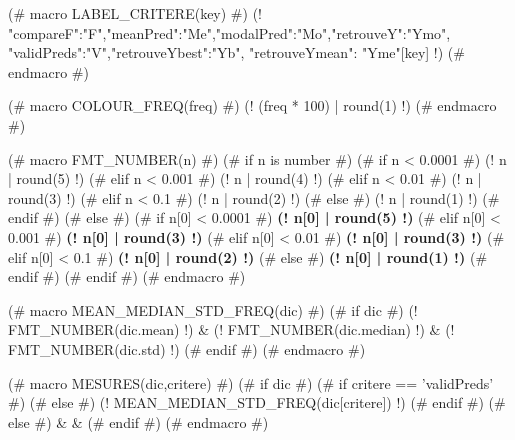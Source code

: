 (# macro LABEL_CRITERE(key) #)
{\small (! {"compareF":"F","meanPred":"Me","modalPred":"Mo","retrouveY":"Ymo",
"validPreds":"V","retrouveYbest":"Yb", "retrouveYmean": "Yme"}[key] !)  }
(# endmacro #)

(# macro COLOUR_FREQ(freq) #)
\textcolor[rgb]{ (! 2 * (1.1 - freq)  | round(3) !) , (! (2 * freq - 1.3) | round(3)  !) , 0.1}{(! (freq * 100) | round(1) !)}
(# endmacro #)

(# macro FMT_NUMBER(n) #)
    (# if n is number #)
(# if n < 0.0001 #)
(! n | round(5) !)
(# elif n < 0.001 #)
(! n | round(4) !)
(# elif n < 0.01 #)
(! n | round(3) !)
(# elif n < 0.1 #)
(! n | round(2) !)
(# else #)
(! n | round(1) !)
(# endif #)
    (# else #)
(# if n[0] < 0.0001 #)
\textbf{ (! n[0] | round(5) !)}
(# elif n[0] < 0.001 #)
\textbf{ (! n[0] | round(3) !)}
(# elif n[0] < 0.01 #)
\textbf{ (! n[0] | round(3) !)}
(# elif n[0] < 0.1 #)
\textbf{ (! n[0] | round(2) !)}
(# else #)
\textbf{ (! n[0] | round(1) !)}
(# endif #)
    (# endif #)
(# endmacro #)


(#  macro MEAN_MEDIAN_STD_FREQ(dic) #)
    (# if dic #)
    (! FMT_NUMBER(dic.mean) !) & {\footnotesize (! FMT_NUMBER(dic.median) !)} & {\footnotesize (! FMT_NUMBER(dic.std)  !) }
    (# endif #)
(# endmacro #)


(#  macro MESURES(dic,critere) #)
(# if dic #)
    (# if critere == 'validPreds' #)
    (# else #)
    (!  MEAN_MEDIAN_STD_FREQ(dic[critere]) !)
    (# endif #)
(# else #)
& &
(# endif #)
(# endmacro #)
